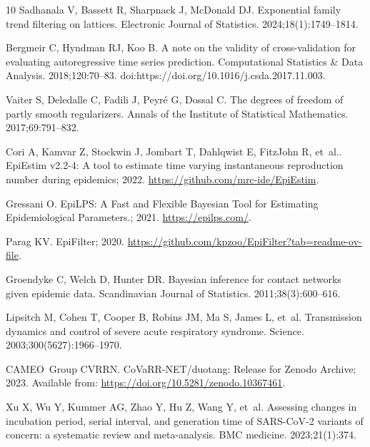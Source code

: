 \documentclass[10pt,letterpaper]{article}
\begin{document}
\begin{thebibliography}{10}
  Sadhanala V, Bassett R, Sharpnack J, McDonald DJ.
  \newblock Exponential family trend filtering on lattices.
  \newblock Electronic Journal of Statistics. 2024;18(1):1749--1814.
  
  Bergmeir C, Hyndman RJ, Koo B.
  \newblock A note on the validity of cross-validation for evaluating
    autoregressive time series prediction.
  \newblock Computational Statistics \& Data Analysis. 2018;120:70--83.
  \newblock doi:{https://doi.org/10.1016/j.csda.2017.11.003}.
  
  Vaiter S, Deledalle C, Fadili J, Peyr{\'e} G, Dossal C.
  \newblock The degrees of freedom of partly smooth regularizers.
  \newblock Annals of the Institute of Statistical Mathematics. 2017;69:791--832.
  
  Cori A, Kamvar Z, Stockwin J, Jombart T, Dahlqwist E, FitzJohn R, et~al..
    {EpiEstim v2.2-4: A tool to estimate time varying instantaneous reproduction
    number during epidemics}; 2022.
  \newblock \url{https://github.com/mrc-ide/EpiEstim}.
  
  Gressani O. {EpiLPS: {A} {F}ast and {F}lexible {B}ayesian {T}ool for
    {E}stimating {E}pidemiological {P}arameters.}; 2021.
  \newblock \url{https://epilps.com/}.
  
  Parag KV. {EpiFilter}; 2020.
  \newblock \url{https://github.com/kpzoo/EpiFilter?tab=readme-ov-file}.
  
  Groendyke C, Welch D, Hunter DR.
  \newblock Bayesian inference for contact networks given epidemic data.
  \newblock Scandinavian Journal of Statistics. 2011;38(3):600--616.
  
  Lipsitch M, Cohen T, Cooper B, Robins JM, Ma S, James L, et~al.
  \newblock Transmission dynamics and control of severe acute respiratory
    syndrome.
  \newblock Science. 2003;300(5627):1966--1970.
  
  CAMEO~Group CVRRN. CoVaRR-NET/duotang: Release for Zenodo Archive; 2023.
  \newblock Available from: \url{https://doi.org/10.5281/zenodo.10367461}.
  
  Xu X, Wu Y, Kummer AG, Zhao Y, Hu Z, Wang Y, et~al.
  \newblock Assessing changes in incubation period, serial interval, and
    generation time of SARS-CoV-2 variants of concern: a systematic review and
    meta-analysis.
  \newblock BMC medicine. 2023;21(1):374.
  

\end{thebibliography}
\end{document}

